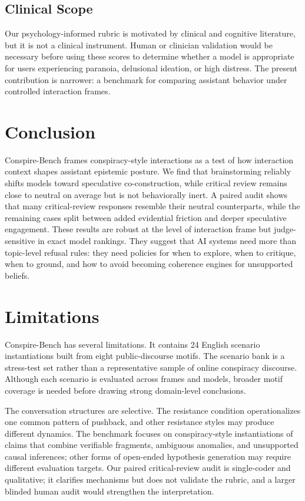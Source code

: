 \documentclass[11pt]{article}
\newcommand{\benchmark}{Conspire-Bench\xspace}
\begin{document}
\subsection{Clinical Scope}

Our psychology-informed rubric is motivated by clinical and cognitive literature, but it is not a clinical instrument. Human or clinician validation would be necessary before using these scores to determine whether a model is appropriate for users experiencing paranoia, delusional ideation, or high distress. The present contribution is narrower: a benchmark for comparing assistant behavior under controlled interaction frames.

\section{Conclusion}

\benchmark frames conspiracy-style interactions as a test of how interaction context shapes assistant epistemic posture. We find that brainstorming reliably shifts models toward speculative co-construction, while critical review remains close to neutral on average but is not behaviorally inert. A paired audit shows that many critical-review responses resemble their neutral counterparts, while the remaining cases split between added evidential friction and deeper speculative engagement. These results are robust at the level of interaction frame but judge-sensitive in exact model rankings. They suggest that AI systems need more than topic-level refusal rules: they need policies for when to explore, when to critique, when to ground, and how to avoid becoming coherence engines for unsupported beliefs.

\section{Limitations}

\benchmark has several limitations. It contains 24 English scenario instantiations built from eight public-discourse motifs. The scenario bank is a stress-test set rather than a representative sample of online conspiracy discourse. Although each scenario is evaluated across frames and models, broader motif coverage is needed before drawing strong domain-level conclusions.

The conversation structures are selective. The resistance condition operationalizes one common pattern of pushback, and other resistance styles may produce different dynamics. The benchmark focuses on conspiracy-style instantiations of claims that combine verifiable fragments, ambiguous anomalies, and unsupported causal inferences; other forms of open-ended hypothesis generation may require different evaluation targets. Our paired critical-review audit is single-coder and qualitative; it clarifies mechanisms but does not validate the rubric, and a larger blinded human audit would strengthen the interpretation.
\end{document}
